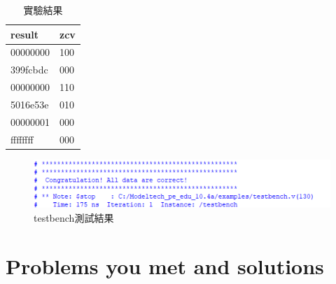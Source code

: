 \documentclass[12pt,a4paper]{article}
\theoremstyle{definition}
\begin{document}
\begin{table}[H]
\centering
\caption
{實驗結果}
\label{tab:result}
\begin{tabular}{ll} \toprule
result & zcv \\
\midrule
00000000 & 100
\\
399fcbdc & 000
\\
00000000 & 110
\\
5016e53e & 010
\\
00000001 & 000
\\
ffffffff & 000
\\ \bottomrule
\end{tabular}
\end{table}

\begin{figure}[H]
\centering
\includegraphics[width=16cm]{fig/result.png}
\caption{testbench測試結果}
\label{fig:result}
\end{figure}

\section{Problems you met and solutions}
\end{document}
